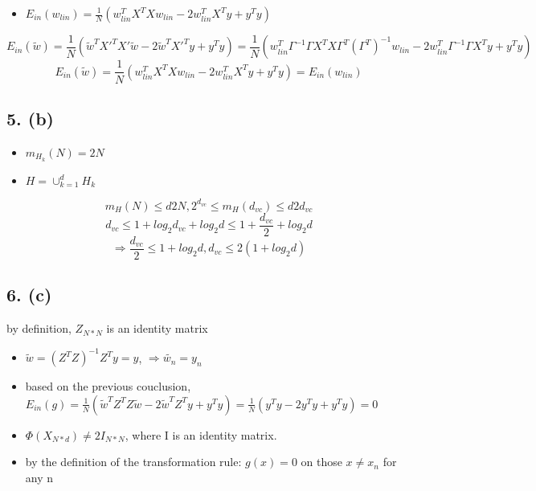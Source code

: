 \documentclass[12pt,a4paper]{article}
\begin{document}
\begin{itemize}
\item $E_{in}(w_{lin}) = \frac{1}{N}(w_{lin}^TX^TXw_{lin} - 2w_{lin}^TX^Ty + y^Ty)$

\end{itemize}
\[
E_{in}(\tilde{w}) =
    \frac{1}{N}(\tilde{w}^TX'^TX'\tilde{w} - 2\tilde{w}^TX'^Ty + y^Ty) =
    \frac{1}{N}(w_{lin}^T\Gamma^{-1}\Gamma X^TX\Gamma^T(\Gamma^T)^{-1}w_{lin} - 2w_{lin}^T\Gamma^{-1}\Gamma X^Ty + y^Ty)
\]
\[
E_{in}(\tilde{w}) = 
    \frac{1}{N}(w_{lin}^TX^TXw_{lin} - 2w_{lin}^TX^Ty + y^Ty) = 
    E_{in}(w_{lin})
\]
\subsection{5. (b)}
\begin{itemize}
\item $m_{H_k}(N) = 2N$


\item $H = \cup_{k=1}^dH_k$

\end{itemize}
\[
m_H(N)\le d2N, 2^{d_{vc}} \le m_H(d_{vc}) \le d2d_{vc}
\]
\[
d_{vc} \le 1+log_2d_{vc}+log_2d \le 1+\frac{d_{vc}}{2}+log_2d
\]
\[
\Rightarrow \frac{d_{vc}}{2} \le 1+log_2d, d_{vc} \le 2(1+log_2d)
\]
\subsection{6. (c)}
by definition, $Z_{N*N}$ is an identity matrix

\begin{itemize}
\item $\tilde{w} = (Z^TZ)^{-1}Z^Ty = y$, $\Rightarrow \tilde{w_n} = y_n$


\item based on the previous couclusion, $E_{in}(g) = \frac{1}{N}(\tilde{w}^TZ^TZ\tilde{w} - 2\tilde{w}^TZ^Ty + y^Ty) = \frac{1}{N}(y^Ty - 2y^Ty + y^Ty) = 0$


\item $\Phi(X_{N*d}) \neq 2I_{N*N}$, where I is an identity matrix.


\item by the definition of the transformation rule: $g(x) = 0$ on those $x \neq x_n$ for any n

\end{itemize}
\end{document}
